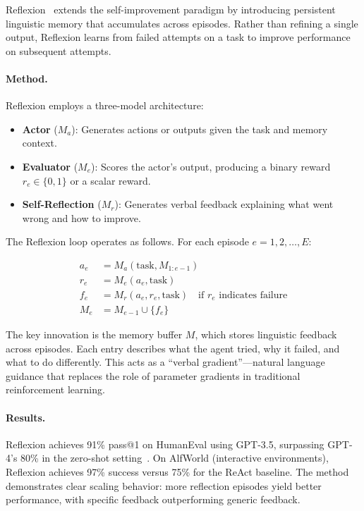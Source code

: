 Reflexion~\citep{shinn2023reflexion} extends the self-improvement paradigm by introducing persistent linguistic memory that accumulates across episodes. Rather than refining a single output, Reflexion learns from failed attempts on a task to improve performance on subsequent attempts.

\paragraph{Method.}
Reflexion employs a three-model architecture:

\begin{itemize}
    \item \textbf{Actor} ($M_a$): Generates actions or outputs given the task and memory context.
    \item \textbf{Evaluator} ($M_e$): Scores the actor's output, producing a binary reward $r_e \in \{0, 1\}$ or a scalar reward.
    \item \textbf{Self-Reflection} ($M_r$): Generates verbal feedback explaining what went wrong and how to improve.
\end{itemize}

The Reflexion loop operates as follows. For each episode $e = 1, 2, \ldots, E$:

\begin{align}
    a_e &= M_a(\text{task}, M_{1:e-1}) \label{eq:reflexion-actor} \\
    r_e &= M_e(a_e, \text{task}) \label{eq:reflexion-eval} \\
    f_e &= M_r(a_e, r_e, \text{task}) \quad \text{if } r_e \text{ indicates failure} \label{eq:reflexion-reflect} \\
    M_e &= M_{e-1} \cup \{f_e\} \label{eq:reflexion-memory}
\end{align}

The key innovation is the memory buffer $M$, which stores linguistic feedback across episodes. Each entry describes what the agent tried, why it failed, and what to do differently. This acts as a ``verbal gradient''---natural language guidance that replaces the role of parameter gradients in traditional reinforcement learning.

\paragraph{Results.}
Reflexion achieves 91\% pass@1 on HumanEval using GPT-3.5, surpassing GPT-4's 80\% in the zero-shot setting~\citep{shinn2023reflexion}. On AlfWorld (interactive environments), Reflexion achieves 97\% success versus 75\% for the ReAct baseline. The method demonstrates clear scaling behavior: more reflection episodes yield better performance, with specific feedback outperforming generic feedback.

